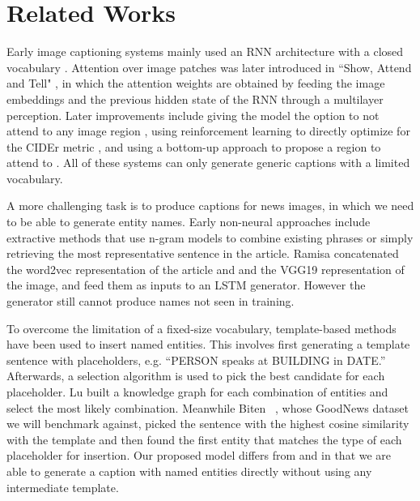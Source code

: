 
\section{Related Works}

Early image captioning systems mainly used an RNN architecture with a closed
vocabulary \cite{Karpathy2015DeepVA, Donahue2015LongTR, Vinyals2015ShowAT}.
Attention over image patches was later introduced in ``Show, Attend and Tell"
\cite{Xu2015ShowAA}, in which the attention weights are obtained by feeding the
image embeddings and the previous hidden state of the RNN through a multilayer
perception. Later improvements include giving the model the option to not
attend to any image region \cite{Lu2017KnowingWT}, using reinforcement learning
to directly optimize for the CIDEr metric \cite{Rennie2017SelfCriticalST,
Gao2019DeliberateAN}, and using a bottom-up approach to propose a region to
attend to \cite{Anderson2017BottomUpAT}. All of these systems can only generate
generic captions with a limited vocabulary.

A more challenging task is to produce captions for news images, in which we
need to be able to generate entity names. Early non-neural approaches include
extractive methods that use n-gram models to combine existing phrases
\cite{Feng2013AutomaticCG} or simply retrieving the most representative
sentence \cite{Tariq2017ACE} in the article. Ramisa \etal
\cite{Ramisa2016BreakingNewsAA} concatenated the word2vec representation of the
article and and the VGG19 representation of the image, and feed them as inputs
to an LSTM generator. However the generator still cannot produce names not
seen in training.

To overcome the limitation of a fixed-size vocabulary, template-based methods
have been used to insert named entities. This involves first generating a
template sentence with placeholders, e.g. ``PERSON speaks at BUILDING in
DATE.'' Afterwards, a selection algorithm is used to pick the best candidate
for each placeholder. Lu \etal \cite{Lu2018EntityAI} built a knowledge graph
for each combination of entities and select the most likely combination.
Meanwhile Biten \etal~\cite{Biten2019GoodNews}, whose GoodNews dataset we will
benchmark against, picked the sentence with the highest cosine similarity with
the template and then found the first entity that matches the type of each
placeholder for insertion. Our proposed model differs from
\cite{Lu2018EntityAI} and \cite{Biten2019GoodNews} in that we are able to
generate a caption with named entities directly without using any intermediate
template.

